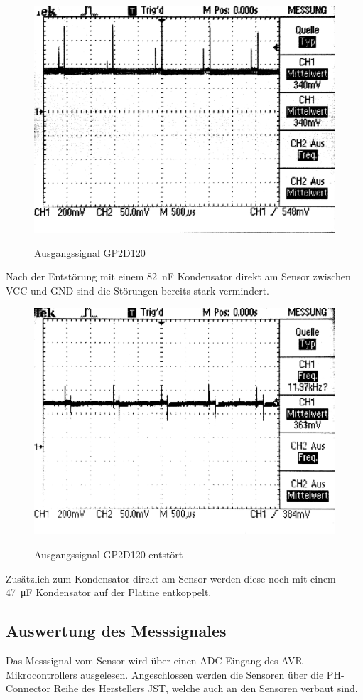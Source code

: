 \begin{figure}[H]
\centering
\includegraphics[width=.8\textwidth]{IR_spikes.png}\\
\caption{Ausgangssignal GP2D120}%
\label{fig:IR_spikes}
\end{figure}

Nach der Entstörung mit einem \SI{82}{\nano\farad} Kondensator direkt am Sensor zwischen VCC und GND sind die Störungen bereits stark vermindert.

\begin{figure}[H]
\centering
\includegraphics[width=.8\textwidth]{IR_lessspikes.png}\\
\caption{Ausgangssignal GP2D120 entstört}%
\label{fig:IR_lessspikes}
\end{figure}

Zusätzlich zum Kondensator direkt am Sensor werden diese noch mit einem \SI{47}{\micro\farad} Kondensator auf der Platine entkoppelt.

\subsection{Auswertung des Messsignales}
Das Messsignal vom Sensor wird über einen ADC-Eingang des AVR Mikrocontrollers ausgelesen. Angeschlossen werden die Sensoren über die PH-Connector Reihe des Herstellers JST, welche auch an den Sensoren verbaut sind.



